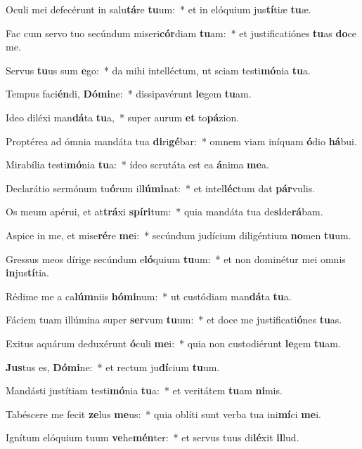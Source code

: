 \item Oculi mei defecérunt in salu\textbf{tá}re \textbf{tu}um:~* et in elóquium jus\textbf{tí}tiæ \textbf{tu}æ.
\item Fac cum servo tuo secúndum miseri\textbf{cór}diam \textbf{tu}am:~* et justificatiónes \textbf{tu}as \textbf{do}ce me.
\item Servus \textbf{tu}us sum \textbf{e}go:~* da mihi intelléctum, ut sciam testi\textbf{mó}nia \textbf{tu}a.
\item Tempus faci\textbf{én}di, \textbf{Dó}\textbf{mi}ne:~* dissipavérunt \textbf{le}gem \textbf{tu}am.
\item Ideo diléxi man\textbf{dá}ta \textbf{tu}a,~* super aurum \textbf{et} to\textbf{pá}zion.
\item Proptérea ad ómnia mandáta tua \textbf{di}ri\textbf{gé}bar:~* omnem viam iníquam \textbf{ó}dio \textbf{há}bui.
\item Mirabília testi\textbf{mó}nia \textbf{tu}a:~* ídeo scrutáta est ea \textbf{á}nima \textbf{me}a.
\item Declarátio sermónum tu\textbf{ó}rum il\textbf{lú}\textbf{mi}nat:~* et intel\textbf{léc}tum dat \textbf{pár}vulis.
\item Os meum apérui, et at\textbf{trá}xi \textbf{spí}\textbf{ri}tum:~* quia mandáta tua de\textbf{si}de\textbf{rá}bam.
\item Aspice in me, et mise\textbf{ré}re \textbf{me}i:~* secúndum judícium diligéntium \textbf{no}men \textbf{tu}um.
\item Gressus meos dírige secúndum e\textbf{ló}quium \textbf{tu}um:~* et non dominétur mei omnis \textbf{in}jus\textbf{tí}tia.
\item Rédime me a ca\textbf{lúm}niis \textbf{hó}\textbf{mi}num:~* ut custódiam man\textbf{dá}ta \textbf{tu}a.
\item Fáciem tuam illúmina super \textbf{ser}vum \textbf{tu}um:~* et doce me justificati\textbf{ó}nes \textbf{tu}as.
\item Exitus aquárum deduxérunt \textbf{ó}culi \textbf{me}i:~* quia non custodiérunt \textbf{le}gem \textbf{tu}am.
\item \textbf{Jus}tus es, \textbf{Dó}\textbf{mi}ne:~* et rectum ju\textbf{dí}cium \textbf{tu}um.
\item Mandásti justítiam testi\textbf{mó}nia \textbf{tu}a:~* et veritátem \textbf{tu}am \textbf{ni}mis.
\item Tabéscere me fecit \textbf{ze}lus \textbf{me}us:~* quia oblíti sunt verba tua ini\textbf{mí}ci \textbf{me}i.
\item Ignítum elóquium tuum \textbf{ve}he\textbf{mén}ter:~* et servus tuus di\textbf{lé}xit \textbf{il}lud.
